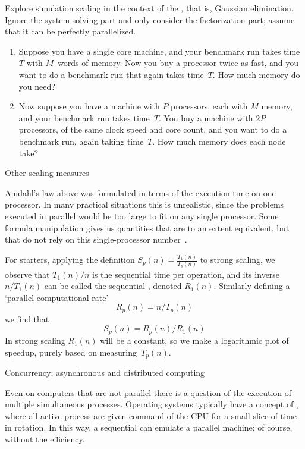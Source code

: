 \begin{exercise}
  \label{ex:scal-linpack}
  Explore simulation scaling in the context of the
  ,
  that is, Gaussian elimination.
  Ignore the system solving part and
  only consider the factorization part;
  assume that it can be perfectly parallelized.
  \begin{enumerate}
  \item Suppose you have a single core machine,
    and your benchmark run takes time~$T$ with $M$~words of memory.
    Now you buy a processor twice as fast, and you want to do a
    benchmark run that again takes time~$T$. How much memory do you need?
  \item Now suppose you have a machine with $P$ processors,
    each with $M$ memory, and your benchmark run takes time~$T$.
    You buy a machine with $2P$ processors, of the same clock speed
    and core count, and you want to do a benchmark run, again
    taking time~$T$. How much memory does each node take?
  \end{enumerate}
\end{exercise}

 {Other scaling measures}

Amdahl's law above was formulated in terms of the execution time on
one processor. In many practical situations this is unrealistic, since
the problems executed in parallel would be too large
to fit on any single processor.
Some formula manipulation gives us quantities that are to
an extent equivalent, but that do not rely on this single-processor
number~\cite{Moreland:formalmetrics2015}.

For starters, applying the definition
%
$S_p(n) = \frac{ T_1(n) }{ T_p(n) }$
%
to strong scaling, we observe that $T_1(n)/n$ is the sequential time
per operation, and its inverse $n/T_1(n)$ can be called the sequential
, denoted $R_1(n)$. Similarly
defining a `parallel computational rate'
\[ R_p(n) = n/T_p(n) \]
we find that
\[ S_p(n) = R_p(n)/R_1(n) \]
In strong scaling $R_1(n)$ will be a constant, so we
make a logarithmic plot of speedup, purely based on measuring~$T_p(n)$.


 {Concurrency; asynchronous and distributed computing}

Even on computers that are not parallel there is a question of the
execution of multiple simultaneous processes. Operating systems
typically have a concept of , where all active
process are given command of the \ac{CPU} for a small slice of time in
rotation. In this way, a sequential can emulate a parallel machine; of
course, without the efficiency.

